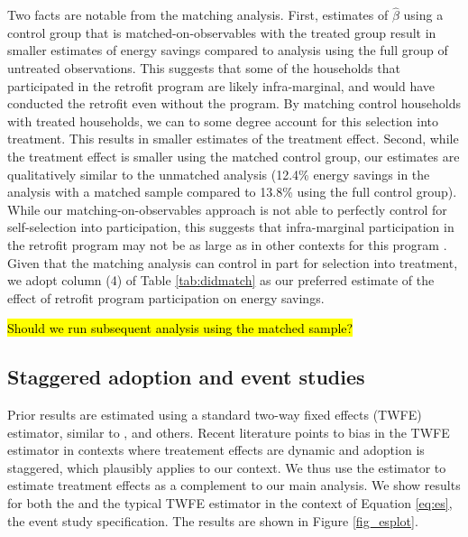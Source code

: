 \documentclass{article}
\newcommand{\hlc}[2][yellow]{ {\sethlcolor{#1} \hl{#2}} }
\begin{document}
Two facts are notable from the matching analysis.  First, estimates of $\hat{\beta}$ using a control group that is matched-on-observables with the treated group result in smaller estimates of energy savings compared to analysis using the full group of untreated observations. This suggests that some of the households that participated in the retrofit program are likely infra-marginal, and would have conducted the retrofit even without the program. By matching control households with treated households, we can to some degree account for this selection into treatment. This results in smaller estimates of the treatment effect. Second, while the treatment effect is smaller using the matched control group, our estimates are qualitatively similar to the unmatched analysis (12.4\% energy savings in the analysis with a matched sample compared to 13.8\% using the full control group). While our matching-on-observables approach is not able to perfectly control for self-selection into participation, this suggests that infra-marginal participation in the retrofit program may not be as large as in other contexts for this program \citep{grosche2009willingness, boomhower2014credible}. Given that the matching analysis can control in part for selection into treatment, we adopt column (4) of Table \ref{tab:didmatch} as our preferred estimate of the effect of retrofit program participation on energy savings.

\hlc{Should we run subsequent analysis using the matched sample?}



\subsection{Staggered adoption and event studies}

Prior results are estimated using a standard two-way fixed effects (TWFE) estimator, similar to \cite{liang2018energy, chuang2022residential, fowlie2018energy}, and others. Recent literature points to bias in the TWFE estimator in contexts where treatement effects are dynamic and adoption is staggered, which plausibly applies to our context. We thus use the \cite{sun2021estimating} estimator to estimate treatment effects as a complement to our main analysis. We show results for both the \cite{sun2021estimating} and the typical TWFE estimator in the context of Equation \eqref{eq:es}, the event study specification. The results are shown in Figure \ref{fig_esplot}.
\end{document}
